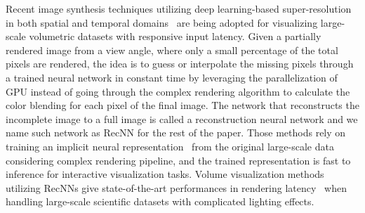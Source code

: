Recent image synthesis techniques utilizing deep learning-based super-resolution in both spatial and temporal domains~\cite{10.1145/3485132,10.1007/978-3-030-00563-4_11, liu2022video} are being adopted for visualizing large-scale volumetric datasets with responsive input latency. Given a partially rendered image from a view angle, where only a small percentage of the total pixels are rendered, the idea is to guess or interpolate the missing pixels through a trained neural network in constant time by leveraging the parallelization of GPU instead of going through the complex rendering algorithm to calculate the color blending for each pixel of the final image. The network that reconstructs the incomplete image to a full image is called a reconstruction neural network and we name such network as RecNN for the rest of the paper. Those methods rely on training an implicit neural representation~\cite{NEURIPS2020_53c04118, 10.1007/978-3-031-19809-0_5} from the original large-scale data considering complex rendering pipeline, and the trained representation is fast to inference for interactive visualization tasks. Volume visualization methods utilizing RecNNs give state-of-the-art performances in rendering latency~\cite{8237743, 9903564} when handling large-scale scientific datasets with complicated lighting effects.

